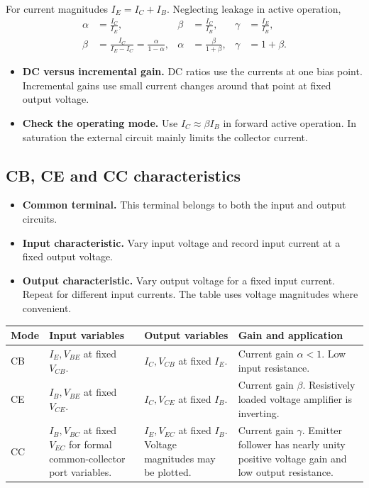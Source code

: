 \documentclass[12pt,a4paper]{article}
\begin{document}
For current magnitudes \(I_E=I_C+I_B\). Neglecting leakage in active operation,
\[
\begin{aligned}
\alpha&=\frac{I_C}{I_E},&
\beta&=\frac{I_C}{I_B},&
\gamma&=\frac{I_E}{I_B},\\
\beta&=\frac{I_C}{I_E-I_C}
      =\frac{\alpha}{1-\alpha},&
\alpha&=\frac{\beta}{1+\beta},&
\gamma&=1+\beta .
\end{aligned}
\]
\begin{itemize}[leftmargin=*, itemsep=3pt, topsep=4pt]
  \item \textbf{DC versus incremental gain.} DC ratios use the currents at one bias point. Incremental gains use small current changes around that point at fixed output voltage.
  \item \textbf{Check the operating mode.} Use \(I_C\approx\beta I_B\) in forward active operation. In saturation the external circuit mainly limits the collector current.
\end{itemize}

\subsection{CB, CE and CC characteristics}
\begin{itemize}[leftmargin=*, itemsep=3pt, topsep=4pt]
  \item \textbf{Common terminal.} This terminal belongs to both the input and output circuits.
  \item \textbf{Input characteristic.} Vary input voltage and record input current at a fixed output voltage.
  \item \textbf{Output characteristic.} Vary output voltage for a fixed input current. Repeat for different input currents. The table uses voltage magnitudes where convenient.
\end{itemize}
\par\vspace{6pt}\noindent
\begin{tabularx}{\linewidth}{|B{2cm}|Y|Y|Y|}\hline
Mode & \textbf{Input variables} & \textbf{Output variables} & \textbf{Gain and application} \\ \hline
CB & \(I_E,V_{BE}\) at fixed \(V_{CB}\). & \(I_C,V_{CB}\) at fixed \(I_E\). & Current gain \(\alpha<1\). Low input resistance. \\ \hline
CE & \(I_B,V_{BE}\) at fixed \(V_{CE}\). & \(I_C,V_{CE}\) at fixed \(I_B\). & Current gain \(\beta\). Resistively loaded voltage amplifier is inverting. \\ \hline
CC & \(I_B,V_{BC}\) at fixed \(V_{EC}\) for formal common-collector port variables. & \(I_E,V_{EC}\) at fixed \(I_B\). Voltage magnitudes may be plotted. & Current gain \(\gamma\). Emitter follower has nearly unity positive voltage gain and low output resistance. \\ \hline
\end{tabularx}
\end{document}
